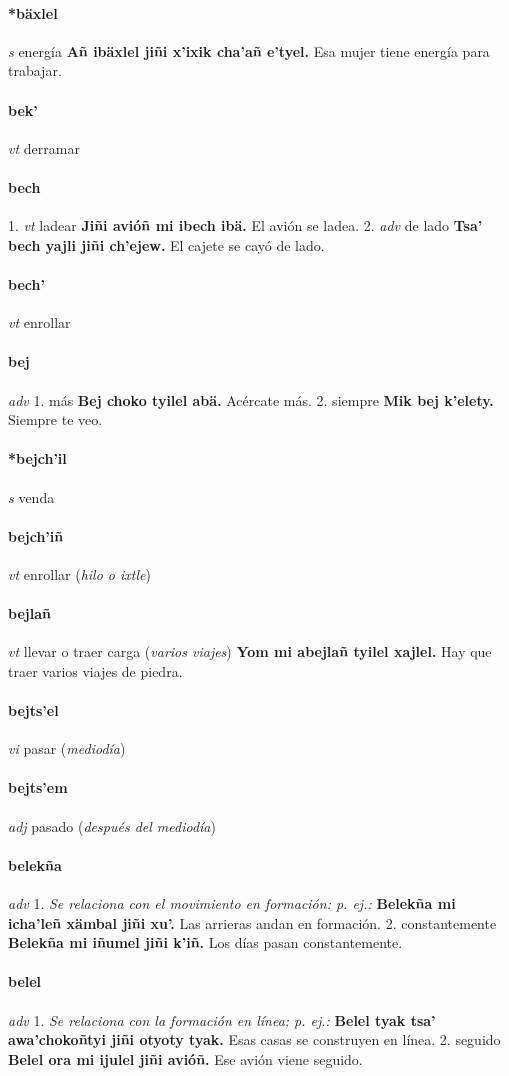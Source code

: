 \documentclass{scrbook}
\newcommand{\entry}[1]{\paragraph{#1}}
\newcommand{\onedefinition}[1]{#1.}
\newcommand{\nontranslationdef}[1]{\textit{#1}}
\newcommand{\partofspeech}[1]{\textit{#1}}
\newcommand{\spanishtranslation}[1]{#1}
\newcommand{\clarification}[1]{(\textit{#1})}
\newcommand{\cholexample}[1]{\textbf{#1}}
\newcommand{\exampletranslation}[1]{#1}
\begin{document}
\begin{multicols}{2}
\entry{*bäxlel}
\partofspeech{s}
\spanishtranslation{energía}
\cholexample{Añ ibäxlel jiñi x'ixik cha'añ e'tyel.}
\exampletranslation{Esa mujer tiene energía para trabajar.}

\entry{bek'}
\partofspeech{vt}
\spanishtranslation{derramar}

\entry{bech}
\onedefinition{1}
\partofspeech{vt}
\spanishtranslation{ladear}
\cholexample{Jiñi avióñ mi ibech ibä.}
\exampletranslation{El avión se ladea.}
\onedefinition{2}
\partofspeech{adv}
\spanishtranslation{de lado}
\cholexample{Tsa' bech yajli jiñi ch'ejew.}
\exampletranslation{El cajete se cayó de lado.}

\entry{bech'}
\partofspeech{vt}
\spanishtranslation{enrollar}

\entry{bej}
\partofspeech{adv}
\onedefinition{1}
\spanishtranslation{más}
\cholexample{Bej choko tyilel abä.}
\exampletranslation{Acércate más.}
\onedefinition{2}
\spanishtranslation{siempre}
\cholexample{Mik bej k'elety.}
\exampletranslation{Siempre te veo.}

\entry{*bejch'il}
\partofspeech{s}
\spanishtranslation{venda}

\entry{bejch'iñ}
\partofspeech{vt}
\spanishtranslation{enrollar}
\clarification{hilo o ixtle}

\entry{bejlañ}
\partofspeech{vt}
\spanishtranslation{llevar o traer carga}
\clarification{varios viajes}
\cholexample{Yom mi abejlañ tyilel xajlel.}
\exampletranslation{Hay que traer varios viajes de piedra.}

\entry{bejts'el}
\partofspeech{vi}
\spanishtranslation{pasar}
\clarification{mediodía}

\entry{bejts'em}
\partofspeech{adj}
\spanishtranslation{pasado}
\clarification{después del mediodía}

\entry{belekña}
\partofspeech{adv}
\onedefinition{1}
\nontranslationdef{Se relaciona con el movimiento en formación: p. ej.:}
\cholexample{Belekña mi icha'leñ xämbal jiñi xu'.}
\exampletranslation{Las arrieras andan en formación.}
\onedefinition{2}
\spanishtranslation{constantemente}
\cholexample{Belekña mi iñumel jiñi k'iñ.}
\exampletranslation{Los días pasan constantemente.}

\entry{belel}
\partofspeech{adv}
\onedefinition{1}
\nontranslationdef{Se relaciona con la formación en línea; p. ej.:}
\cholexample{Belel tyak tsa' awa'chokoñtyi jiñi otyoty tyak.}
\exampletranslation{Esas casas se construyen en línea.}
\onedefinition{2}
\spanishtranslation{seguido}
\cholexample{Belel ora mi ijulel jiñi avióñ.}
\exampletranslation{Ese avión viene seguido.}


\end{multicols}
\end{document}

